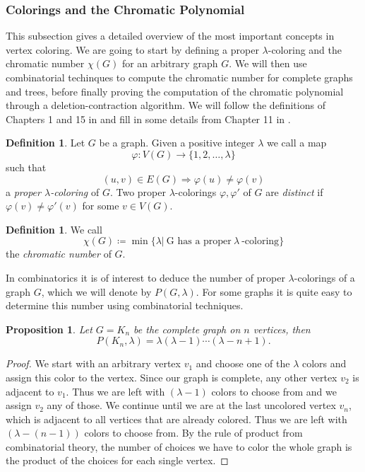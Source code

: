 \documentclass[12pt,a4paper, twoside, autooneside=false]{scrartcl}
\newtheorem{proposition}[theorem]{Proposition}
\theoremstyle{definition}
\newtheorem{definition}[theorem]{Definition}
\theoremstyle{remark}
\numberwithin{equation}{section}
\begin{document}
\subsubsection{Colorings and the Chromatic Polynomial}
This subsection gives a detailed overview of the most important concepts in vertex coloring. We are going to start by defining a proper $\lambda$-coloring and the chromatic number $\chi(G)$ for an arbitrary graph $G$. We will then use combinatorial techinques to compute the chromatic number for complete graphs and trees, before finally proving the computation of the chromatic polynomial through a deletion-contraction algorithm. We will follow the definitions of Chapters 1 and 15 in \cite{GoRo2001} and fill in some details from Chapter 11 in \cite{ElMo2022}.
\begin{definition}
Let $G$ be a graph. Given a positive integer $\lambda$ we call a map \[
\varphi: V(G) \to \{1, 2, \dots, \lambda\}
\] such that 
\[
(u,v) \in E(G) \Longrightarrow \varphi(u) \neq \varphi(v)
\]
a \textit{proper $\lambda$-coloring} of $G$. Two proper $\lambda$-colorings $\varphi, \varphi'$ of $G$ are \textit{distinct} if $\varphi(v) \neq \varphi'(v)$ for some $v \in V(G)$. 
\end{definition}
\begin{definition}
We call 
\[
\chi(G) \coloneqq \min\{\lambda |\  \text{G has a proper}\  \lambda \ \text{-coloring}\}
\]
the \textit{chromatic number} of $G$.
\end{definition}
In combinatorics it is of interest to deduce the number of proper $\lambda$-colorings of a graph $G$, which we will denote by $P(G,\lambda)$. For some graphs it is quite easy to determine this number using combinatorial techniques.
\begin{proposition} 
Let $G = K_n$ be the complete graph on $n$ vertices, then 
\[
P(K_n, \lambda) = \lambda(\lambda - 1) \cdots (\lambda - n + 1).
\]
\end{proposition}
\begin{proof}
We start with an arbitrary vertex $v_1$ and choose one of the $\lambda$ colors and assign this color to the vertex. Since our graph is complete, any other vertex $v_2$ is adjacent to $v_1$. Thus we are left with $(\lambda - 1)$ colors to choose from and we assign $v_2$ any of those. We continue until we are at the last uncolored vertex $v_n$, which is adjacent to all vertices that are already colored. Thus we are left with $(\lambda - (n - 1))$ colors to choose from. By the rule of product from combinatorial theory, the number of choices we have to color the whole graph is the product of the choices for each single vertex.
\end{proof}
\end{document}

